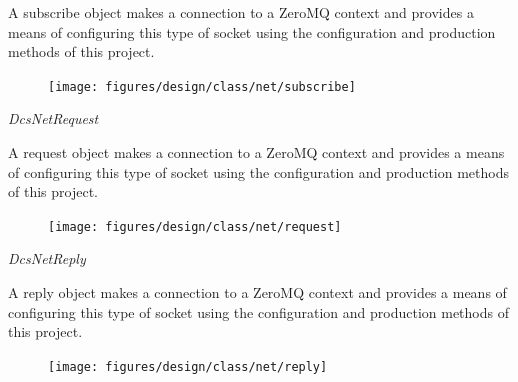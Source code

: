       \vspace*{-0.75cm}
      \begin{minipage}[t]{0.5\textwidth}
        \vspace*{0.5cm}
        A subscribe object makes a connection to a ZeroMQ context and provides a
        means of configuring this type of socket using the configuration and
        production methods of this project.
      \end{minipage} \hfill
      \begin{minipage}[t]{0.45\textwidth}
        \begin{figure}[H]
          \texttt{[image: figures/design/class/net/subscribe]}
          \label{fig:dsg-classes-net-subscribe}
        \end{figure}
      \end{minipage}

      \emph{DcsNetRequest}

      \vspace*{-0.75cm}
      \begin{minipage}[t]{0.5\textwidth}
        \vspace*{0.5cm}
        A request object makes a connection to a ZeroMQ context and provides a
        means of configuring this type of socket using the configuration and
        production methods of this project.
      \end{minipage} \hfill
      \begin{minipage}[t]{0.45\textwidth}
        \begin{figure}[H]
          \texttt{[image: figures/design/class/net/request]}
          \label{fig:dsg-classes-net-request}
        \end{figure}
      \end{minipage}

      \emph{DcsNetReply}

      \vspace*{-0.75cm}
      \begin{minipage}[t]{0.5\textwidth}
        \vspace*{0.5cm}
        A reply object makes a connection to a ZeroMQ context and provides a
        means of configuring this type of socket using the configuration and
        production methods of this project.
      \end{minipage} \hfill
      \begin{minipage}[t]{0.45\textwidth}
        \begin{figure}[H]
          \texttt{[image: figures/design/class/net/reply]}
          \label{fig:dsg-classes-net-reply}
        \end{figure}
      \end{minipage}

